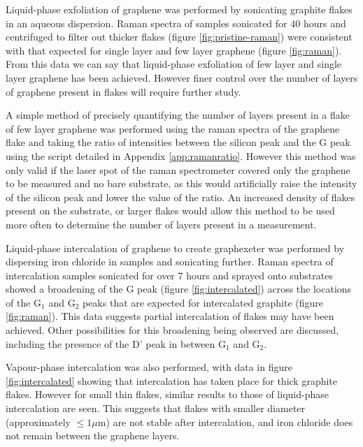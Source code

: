 \documentclass[12pt,titlepage]{article}
\begin{document}
	Liquid-phase exfoliation of graphene was performed by sonicating graphite flakes in an aqueous dispersion. Raman spectra of samples sonicated for 40 hours and centrifuged to filter out thicker flakes (figure \ref{fig:pristine-raman}) were consistent with that expected for single layer and few layer graphene (figure \ref{fig:raman}). From this data we can say that liquid-phase exfoliation of few layer and single layer graphene has been achieved. However finer control over the number of layers of graphene present in flakes will require further study.
	
	A simple method of precisely quantifying the number of layers present in a flake of few layer graphene was performed using the raman spectra of the graphene flake and taking the ratio of intensities between the silicon peak and the G peak using the script detailed in Appendix \ref{app:ramanratio}. However this method was only valid if the laser spot of the raman spectrometer covered only the graphene to be measured and no bare substrate, as this would artificially raise the intensity of the silicon peak and lower the value of the ratio. An increased density of flakes present on the substrate, or larger flakes would allow this method to be used more often to determine the number of layers present in a measurement.
	
	Liquid-phase intercalation of graphene to create graphexeter was performed by dispersing iron chloride in samples and sonicating further. Raman spectra of intercalation samples sonicated for over 7 hours and sprayed onto substrates showed a broadening of the G peak (figure \ref{fig:intercalated}) across the locations of the G$_1$ and G$_2$ peaks that are expected for intercalated graphite (figure \ref{fig:raman}). This data suggests partial intercalation of flakes may have been achieved. Other possibilities for this broadening being observed are discussed, including the presence of the D' peak in between G$_1$ and G$_2$.
	
	Vapour-phase intercalation was also performed, with data in figure \ref{fig:intercalated} showing that intercalation has taken place for thick graphite flakes. However for small thin flakes, similar results to those of liquid-phase intercalation are seen. This suggests that flakes with smaller diameter (approximately $\le 1\mu$m) are not stable after intercalation, and iron chloride does not remain between the graphene layers. 
	
\end{document}
